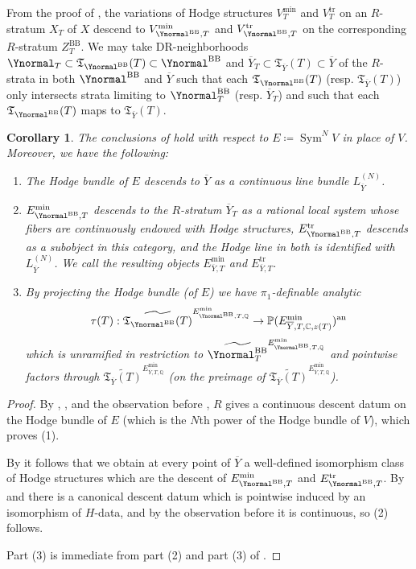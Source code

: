 \documentclass{amsart}
\newcommand{\an}{\operatorname{an}}
\newcommand{\ol}{\overline}
\newtheorem{cor}[theorem]{Corollary}
\theoremstyle{definition}
\theoremstyle{remark}
\def\bQ{\mathbb{Q}}
\def\bC{\mathbb{C}}
\def\bP{\mathbb{P}}
\def\fT{\mathfrak{T}}
\def\an{\mathrm{an}}
\def\trans{\mathrm{tr}}
\def\mini{\mathrm{min}}
\def\BB{\mathrm{BB}}
\def\fT{\mathfrak{T}}
\renewcommand{\bar}[1]{\ol{#1}}
\def\Sym{\operatorname{Sym}}
\numberwithin{equation}{section}
\begin{document}
From the proof of , the variations of Hodge structures $V^\mini_{T}$ and $V^\trans_{T}$ on an $R$-stratum $X_T$ of $X$ descend to $V^\mini_{\Ynormal^\BB,T}$ and $V^\trans_{\Ynormal^\BB, T}$ on the corresponding $R$-stratum $Z^\BB_T$.  We may take DR-neighborhoods $\Ynormal_T\subset\fT_{\Ynormal^\BB}(T)\subset \Ynormal^\BB$ and $\bar Y_T\subset\fT_{\bar Y}(T)\subset \bar Y$ of the $R$-strata in both $\Ynormal^\BB$ and $\bar Y$ such that each $\fT_{\Ynormal^\BB}(T)$ (resp. $\fT_{\bar Y}(T)$) only intersects strata limiting to $\Ynormal^\BB_T$ (resp. $\bar Y_T$) and such that each $\fT_{\Ynormal^\BB}(T)$ maps to $\fT_{\bar Y}(T)$. 
\begin{cor}\label{cor:E stuff on ZBB}The conclusions of  hold with respect to $E\coloneqq  \Sym^N V$ in place of $V$.  Moreover, we have the following:
\begin{enumerate}
\def\symV{E}
\item The Hodge bundle of $\symV$ descends to $\bar Y$ as a continuous line bundle $L_{\bar Y}^{(N)}$.
\item $\symV^\mini_{\Ynormal^\BB,T}$ descends to the $R$-stratum $\bar Y_T$ as a rational local system whose fibers are continuously endowed with Hodge structures, $E^\trans_{\Ynormal^\BB,T}$ descends as a subobject in this category, and the Hodge line in both is identified with $L_{\bar Y}^{(N)}$.  We call the resulting objects $\symV^\mini_{\bar Y,T}$ and $E^\trans_{\bar Y,T}$.
\item By projecting the Hodge bundle (of $E$) we have $\pi_1$-definable analytic
$$\tau(T):\widetilde{\fT_{\Ynormal^\BB}(T)}^{E^\mini_{\Ynormal^\BB,T,\bQ}}\to \bP(E^\mini_{\bar Y,T,\bC,z(T)})^\an$$
which is unramified in restriction to $\widetilde{\Ynormal^\BB_T}^{E^\mini_{\Ynormal^\BB,T,\bQ}}$ and pointwise factors through $\widetilde{\fT_{\bar Y}(T)}^{E^\mini_{\bar Y,T,\bQ}}$ (on the preimage of $\widetilde{\fT_{\bar Y}(T)}^{E^\mini_{\bar Y,T,\bQ}}$).
\end{enumerate}
\end{cor}
\begin{proof}

By , , and the observation before , $R$ gives a continuous descent datum on the Hodge bundle of $E$ (which is the $N$th power of the Hodge bundle of $V$), which proves (1).

By  it follows that we obtain at every point of $\bar Y$ a well-defined isomorphism class of Hodge structures which are the descent of $E^\mini_{\Ynormal^\BB,T}$ and $E^\trans_{\Ynormal^\BB,T}$. By  and  there is a canonical descent datum which is pointwise induced by an isomorphism of $H$-data, and by the observation before  it is continuous, so (2) follows.

Part (3) is immediate from part (2) and part (3) of .
\end{proof}
\end{document}
